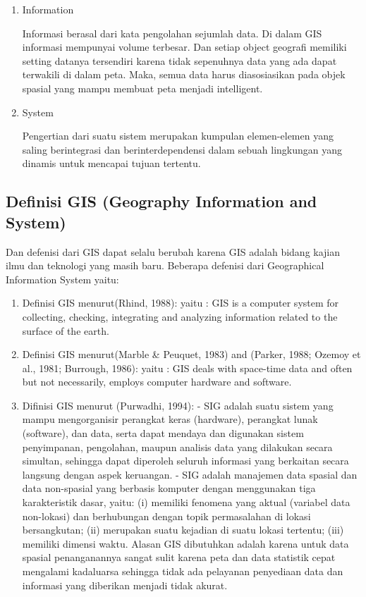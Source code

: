 \begin{enumerate}
\item Information

Informasi berasal dari kata pengolahan sejumlah data. Di dalam GIS informasi mempunyai
volume terbesar. Dan setiap object geografi memiliki setting datanya tersendiri karena 
tidak sepenuhnya data yang ada dapat terwakili di dalam peta. Maka, semua data harus
diasosiasikan pada objek spasial yang mampu membuat peta menjadi intelligent.

\item System

Pengertian dari suatu sistem merupakan kumpulan elemen-elemen yang saling berintegrasi 
dan berinterdependensi dalam sebuah lingkungan yang dinamis untuk mencapai tujuan tertentu.
\end{enumerate}

\subsection{Definisi GIS (Geography Information and System)}
Dan defenisi dari GIS dapat selalu berubah karena GIS adalah bidang kajian ilmu 
dan teknologi yang masih baru. Beberapa defenisi dari Geographical Information System yaitu:
\begin{enumerate}
\item Definisi GIS menurut(Rhind, 1988):
yaitu : GIS is a computer system for collecting, checking, integrating and analyzing
information related to the surface of the earth.

\item Definisi GIS menurut(Marble \& Peuquet, 1983) and (Parker,
1988; Ozemoy et al., 1981; Burrough, 1986):
yaitu : GIS deals with space-time data and often but not necessarily, employs computer
hardware and software.

\item Difinisi GIS menurut (Purwadhi, 1994):
- SIG adalah suatu sistem yang mampu mengorganisir perangkat keras (hardware),
perangkat lunak (software), dan data, serta dapat mendaya dan digunakan sistem
penyimpanan, pengolahan, maupun analisis data yang dilakukan secara simultan, sehingga dapat
diperoleh seluruh informasi yang berkaitan secara langsung dengan aspek keruangan.
- SIG adalah manajemen data spasial dan data non-spasial yang berbasis komputer
dengan menggunakan tiga karakteristik dasar, yaitu: 
(i) memiliki fenomena yang aktual (variabel data non-lokasi) dan berhubungan 
dengan topik permasalahan di lokasi bersangkutan; 
(ii) merupakan suatu kejadian di suatu lokasi tertentu; 
(iii) memiliki dimensi waktu. Alasan GIS dibutuhkan adalah karena untuk data spasial 
penanganannya sangat sulit karena peta dan data statistik cepat mengalami kadaluarsa 
sehingga tidak ada pelayanan penyediaan data dan informasi yang diberikan menjadi tidak akurat.
\end{enumerate} 

